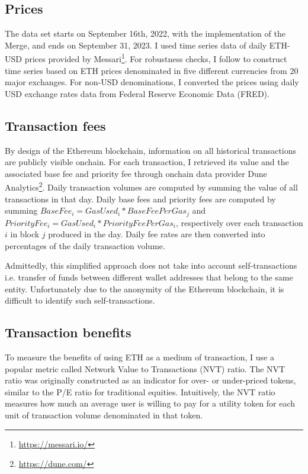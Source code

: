 \documentclass[12pt]{article}
\begin{document}
\subsection{Prices}
The data set starts on September 16th, 2022, with the implementation of the Merge, and ends on September 31, 2023. I used time series data of daily ETH-USD prices provided by Messari\footnote{\url{https://messari.io/}}. For robustness checks, I follow \cite{biais2023equilibrium} to construct time series based on ETH prices denominated in five different currencies from 20 major exchanges. For non-USD denominations, I converted the prices using daily USD exchange rates data from Federal Reserve Economic Data (FRED).


\subsection{Transaction fees}
By design of the Ethereum blockchain, information on all historical transactions are publicly visible onchain. For each transaction, I retrieved its value and the associated base fee and priority fee through onchain data provider Dune Analytics\footnote{\url{https://dune.com/}}. Daily transaction volumes are computed by summing the value of all transactions in that day. Daily base fees and priority fees are computed by summing $BaseFee_i=GasUsed_i*BaseFeePerGas_j$ and $PriorityFee_i=GasUsed_i*PriorityFeePerGas_i$, respectively over each transaction $i$ in block $j$ produced in the day. Daily fee rates are then converted into percentages of the daily transaction volume.

Admittedly, this simplified approach does not take into account self-transactions i.e. transfer of funds between different wallet addresses that belong to the same entity. Unfortunately due to the anonymity of the Ethereum blockchain, it is difficult to identify such self-transactions.

\subsection{Transaction benefits}
To measure the benefits of using ETH as a medium of transaction, I use a popular metric called Network Value to Transactions (NVT) ratio. The NVT ratio was originally constructed as an indicator for over- or under-priced tokens, similar to the P/E ratio for traditional equities. Intuitively, the NVT ratio measures how much an average user is willing to pay for a utility token for each unit of transaction volume denominated in that token. 
\end{document}
